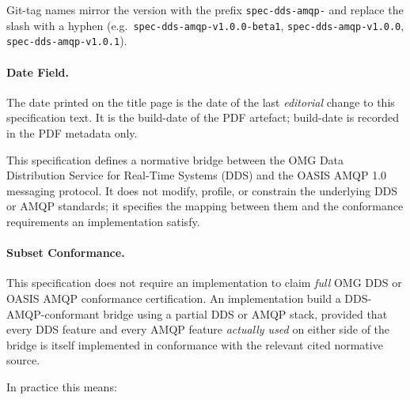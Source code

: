 \documentclass{../styles/zerodds-vendor-spec}
\begin{document}
Git-tag names mirror the version with the prefix
\texttt{spec-dds-amqp-} and replace the slash with a hyphen
(e.g.\ \texttt{spec-dds-amqp-v1.0.0-beta1},
\texttt{spec-dds-amqp-v1.0.0}, \texttt{spec-dds-amqp-v1.0.1}).

\paragraph{Date Field.}
The date printed on the title page is the date of the last
\emph{editorial} change to this specification text. It is
 the build-date of the PDF artefact; build-date is
recorded in the PDF metadata only.

This specification defines a normative bridge between the OMG Data
Distribution Service for Real-Time Systems (DDS) and the OASIS AMQP
1.0 messaging protocol. It does not modify, profile, or constrain the
underlying DDS or AMQP standards; it specifies the mapping between
them and the conformance requirements an implementation 
satisfy.

\paragraph{Subset Conformance.}
This specification does not require an implementation to claim
\emph{full} OMG DDS or OASIS AMQP conformance certification. An
implementation  build a DDS-AMQP-conformant bridge using
a partial DDS or AMQP stack, provided that every DDS feature and
every AMQP feature \emph{actually used} on either side of the
bridge is itself implemented in conformance with the relevant cited
normative source.

In practice this means:
\end{document}
